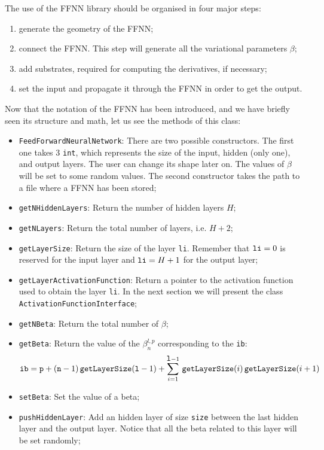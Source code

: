 \documentclass[11pt,a4paper,twoside]{article}
\begin{document}
The use of the FFNN library should be organised in four major steps:
\begin{enumerate}
\item generate the geometry of the FFNN;
\item connect the FFNN. This step will generate all the variational parameters $\beta$;
\item add substrates, required for computing the derivatives, if necessary;
\item set the input and propagate it through the FFNN in order to get the output.
\end{enumerate}

Now that the notation of the FFNN has been introduced, and we have briefly seen its structure and math, let us see the methods of this class:
\begin{itemize}
\item \verb+FeedForwardNeuralNetwork+: There are two possible constructors. The first one takes $3$ \verb+int+, which represents the size of the input, hidden (only one), and output layers. The user can change its shape later on. The values of $\beta$ will be set to some random values. The second constructor takes the path to a file where a FFNN has been stored;
\item \verb+getNHiddenLayers+: Return the number of hidden layers $H$;
\item \verb+getNLayers+: Return the total number of layers, i.e. $H+2$;
\item \verb+getLayerSize+: Return the size of the layer \verb+li+. Remember that $\verb+li+=0$ is reserved for the input layer and $\verb+li+=H+1$ for the output layer;
\item \verb+getLayerActivationFunction+: Return a pointer to the activation function used to obtain the layer \verb+li+. In the next section we will present the class \verb+ActivationFunctionInterface+;
\item \verb+getNBeta+: Return the total number of $\beta$;
\item \verb+getBeta+: Return the value of the $\beta^{l,p}_n$ corresponding to the \verb+ib+:
  $$
  {\verb+ib+} = {\verb+p+} + ({\verb+n+}-1) \, \verb+getLayerSize+({\verb+l+}-1) + \sum_{i=1}^{{\verb+l+}-1} \, \verb+getLayerSize+(i) \, \verb+getLayerSize+(i+1)
  $$
\item \verb+setBeta+: Set the value of a beta;
\item \verb+pushHiddenLayer+: Add an hidden layer of size \verb+size+ between the last hidden layer and the output layer. Notice that all the beta related to this layer will be set randomly;

\end{itemize}
\end{document}
